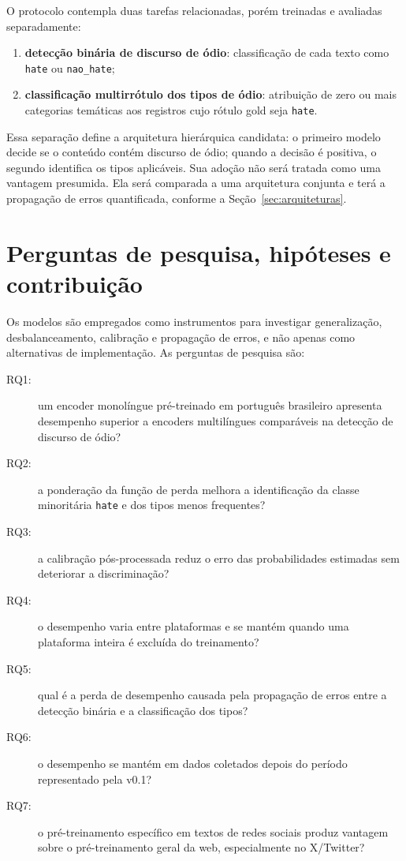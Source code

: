 O protocolo contempla duas tarefas relacionadas, porém treinadas e avaliadas
separadamente:

\begin{enumerate}
    \item \textbf{detecção binária de discurso de ódio}: classificação de cada
    texto como \texttt{hate} ou \texttt{nao\_hate};
    \item \textbf{classificação multirrótulo dos tipos de ódio}: atribuição de
    zero ou mais categorias temáticas aos registros cujo rótulo gold seja
    \texttt{hate}.
\end{enumerate}

Essa separação define a arquitetura hierárquica candidata: o primeiro modelo
decide se o conteúdo contém discurso de ódio; quando a decisão é positiva, o
segundo identifica os tipos aplicáveis. Sua adoção não será tratada como uma
vantagem presumida. Ela será comparada a uma arquitetura conjunta e terá a
propagação de erros quantificada, conforme a Seção~\ref{sec:arquiteturas}.

\section{Perguntas de pesquisa, hipóteses e contribuição}
\label{sec:perguntas-hipoteses}

Os modelos são empregados como instrumentos para investigar generalização,
desbalanceamento, calibração e propagação de erros, e não apenas como alternativas
de implementação. As perguntas de pesquisa são:

\begin{description}
    \item[RQ1:] um encoder monolíngue pré-treinado em português brasileiro
    apresenta desempenho superior a encoders multilíngues comparáveis na
    detecção de discurso de ódio?
    \item[RQ2:] a ponderação da função de perda melhora a identificação da
    classe minoritária \texttt{hate} e dos tipos menos frequentes?
    \item[RQ3:] a calibração pós-processada reduz o erro das probabilidades
    estimadas sem deteriorar a discriminação?
    \item[RQ4:] o desempenho varia entre plataformas e se mantém quando uma
    plataforma inteira é excluída do treinamento?
    \item[RQ5:] qual é a perda de desempenho causada pela propagação de erros
    entre a detecção binária e a classificação dos tipos?
    \item[RQ6:] o desempenho se mantém em dados coletados depois do período
    representado pela v0.1?
    \item[RQ7:] o pré-treinamento específico em textos de redes sociais produz
    vantagem sobre o pré-treinamento geral da web, especialmente no X/Twitter?
\end{description}

